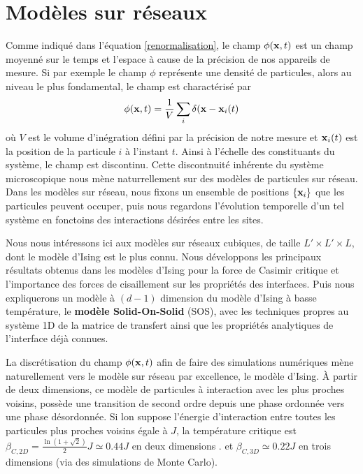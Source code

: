 \chapter{Modèles sur réseaux}
    \label{chap-sos}

Comme indiqué dans l'équation \ref{renormalisation},  le champ $\phi({\bf x},t)$ est un champ moyenné sur le temps et l'espace à cause de la précision de nos appareils de mesure. Si par exemple le champ $\phi$ représente une densité de particules, alors au niveau le plus fondamental, le champ est charactérisé par
\begin{align}
    \phi({\bf x},t) = \frac{1}{V} \sum_i \delta({\bf x}-{\bf x}_i(t) 
\end{align}
où $V$ est le volume d'inégration défini par la précision de notre mesure et ${\bf x}_i(t)$ est la position de la particule $i$ à l'instant $t$.  Ainsi à l'échelle des constituants du système, le champ est discontinu. Cette discontnuité inhérente du système microscopique nous mène naturrellement sur des modèles de particules sur réseau. 
Dans les modèles sur réseau, nous fixons un ensemble de positions $\{{\bf x}_i\}$ que les particules peuvent occuper, puis nous regardons l'évolution temporelle d'un tel système en fonctoins des interactions désirées entre les sites.

Nous nous intéressons ici aux modèles sur réseaux cubiques, de taille $L' \times L' \times L$, dont le modèle d'Ising est le plus connu. Nous développons les principaux résultats obtenus dans les modèles d'Ising pour la force de Casimir critique et l'importance des forces de cisaillement sur les propriétés des interfaces.
Puis nous expliquerons un modèle à $(d-1)$ dimension du modèle d'Ising à basse température, le \textbf{modèle Solid-On-Solid} (SOS), avec les techniques propres au système 1D de la matrice de transfert ainsi que les propriétés analytiques de l'interface déjà connues.
 
La discrétisation du champ $\phi({\bf x},t)$ afin de faire des simulations numériques mène naturellement vers le modèle sur réseau par excellence, le modèle d'Ising. À partir de deux dimensions, ce modèle de particules à interaction avec les plus proches voisins, possède une transition de second ordre depuis une phase ordonnée vers une phase désordonnée. Si lon suppose l'énergie d'interaction entre toutes les particules plus proches voisins égale à $J$, la température critique est $\beta_{C,2D} =  \frac{\ln(1+\sqrt{2})}{2} J \simeq 0.44 J$ en deux dimensions \cite{onsager_crystal_1944}. et $\beta_{C,3D} \simeq 0.22 J$ en trois dimensions \cite{talapov_magnetization_1996} (via des simulations de Monte Carlo).


